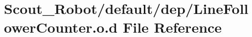 \hypertarget{_line_follower_counter_8o_8d}{
\section{Scout\_\-Robot/default/dep/LineFollowerCounter.o.d File Reference}
\label{_line_follower_counter_8o_8d}
}
